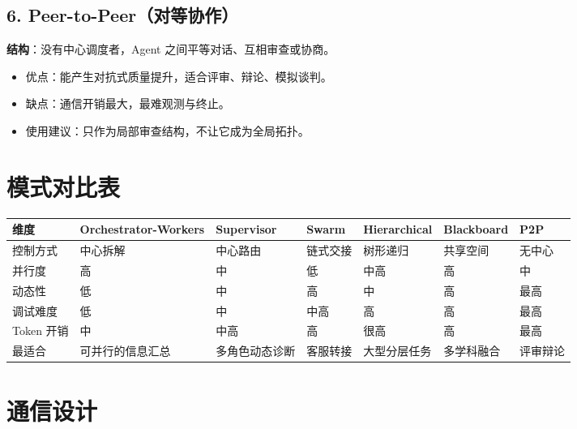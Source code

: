 \documentclass[9pt,a4paper,twocolumn]{ctexart}
\begin{document}
\subsection*{6. Peer-to-Peer（对等协作）}


\textbf{结构}：没有中心调度者，Agent 之间平等对话、互相审查或协商。


\begin{itemize}[itemsep=1pt, topsep=2pt]
  \item 优点：能产生对抗式质量提升，适合评审、辩论、模拟谈判。
  \item 缺点：通信开销最大，最难观测与终止。
  \item 使用建议：只作为局部审查结构，不让它成为全局拓扑。
\end{itemize}


\section*{模式对比表}

{\footnotesize
\begin{tabular}{|p{}|p{}|p{}|p{}|p{}|p{}|p{}|}
\hline
\textbf{维度} & \textbf{Orchestrator-Workers} & \textbf{Supervisor} & \textbf{Swarm} & \textbf{Hierarchical} & \textbf{Blackboard} & \textbf{P2P} \\
\hline
控制方式 & 中心拆解 & 中心路由 & 链式交接 & 树形递归 & 共享空间 & 无中心 \\
\hline
并行度 & 高 & 中 & 低 & 中高 & 高 & 中 \\
\hline
动态性 & 低 & 中 & 高 & 中 & 高 & 最高 \\
\hline
调试难度 & 低 & 中 & 中高 & 高 & 高 & 最高 \\
\hline
Token 开销 & 中 & 中高 & 高 & 很高 & 高 & 最高 \\
\hline
最适合 & 可并行的信息汇总 & 多角色动态诊断 & 客服转接 & 大型分层任务 & 多学科融合 & 评审辩论 \\
\hline
\end{tabular}
}



\section*{通信设计}
\end{document}
